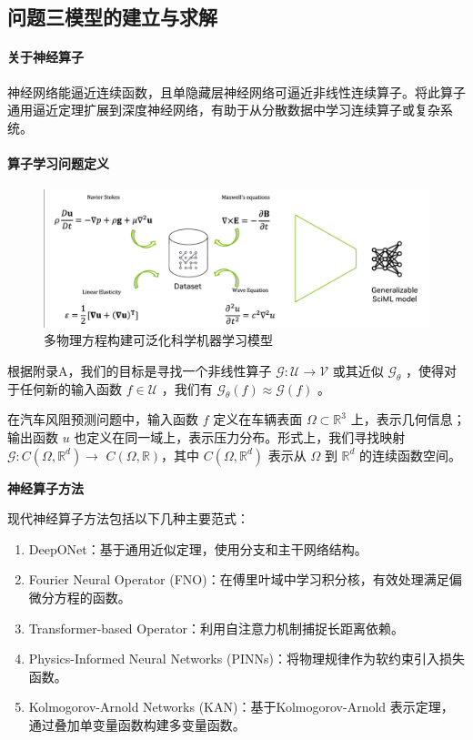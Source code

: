 \documentclass{MMCStyle}
\begin{document}
    
	
 

 
	\subsection{问题三模型的建立与求解}


	\paragraph{关于神经算子}
    神经网络能逼近连续函数，且单隐藏层神经网络可逼近非线性连续算子。将此算子通用逼近定理扩展到深度神经网络，有助于从分散数据中学习连续算子或复杂系统。


	\paragraph{算子学习问题定义}
\begin{figure}[H]
\centering%
\includegraphics[width=13 cm]{figure/fig8.png}
\caption{多物理方程构建可泛化科学机器学习模型}\label{fig8}
\end{figure}   
\unskip


    根据附录A，我们的目标是寻找一个非线性算子 $\mathcal{G}:\mathcal{U}\rightarrow\mathcal{V}$ 或其近似 $\mathcal{G}_{\theta}$ ，使得对于任何新的输入函数 $f\in\mathcal{U}$ ，我们有 $\mathcal{G}_{\theta}(f)\approx\mathcal{G}(f)$ 。  
    
在汽车风阻预测问题中，输入函数 $f$ 定义在车辆表面 $\Omega\subset\mathbb{R}^{3}$ 上，表示几何信息；输出函数 $u$ 也定义在同一域上，表示压力分布。形式上，我们寻找映射 $\mathcal{G}:C(\Omega,\mathbb{R}^{d})\to$ $C(\Omega,\mathbb{R})$，其中 $C(\Omega,\mathbb{R}^{d})$ 表示从 $\Omega$ 到 $\mathbb{R}^{d}$ 的连续函数空间。

\textbf{神经算子方法}

现代神经算子方法包括以下几种主要范式：
        \begin{enumerate}
		\item DeepONet：基于通用近似定理，使用分支和主干网络结构。
		\item Fourier Neural Operator (FNO)：在傅里叶域中学习积分核，有效处理满足偏微分方程的函数。
		\item Transformer-based Operator：利用自注意力机制捕捉长距离依赖。 
		\item Physics-Informed Neural Networks (PINNs)：将物理规律作为软约束引入损失函数。 
		\item Kolmogorov-Arnold Networks (KAN)：基于Kolmogorov-Arnold 表示定理，通过叠加单变量函数构建多变量函数。
	\end{enumerate}
\end{document}
